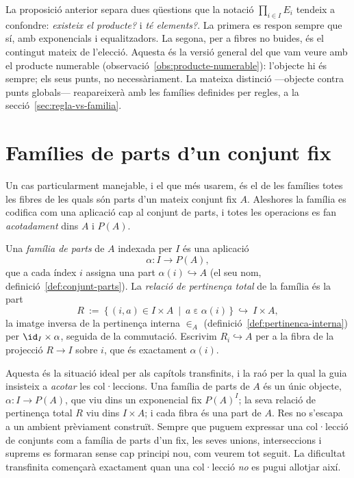 \begin{observacio}\label{obs:objecte-vs-elements}
La proposició anterior separa dues qüestions que la notació
\(\prod_{i\in I}E_i\) tendeix a confondre: \emph{existeix el producte?} i
\emph{té elements?}. La primera es respon sempre que sí, amb exponencials i
equalitzadors. La segona, per a fibres no buides, és el contingut mateix de
l'elecció. Aquesta és la versió general del que vam veure amb el producte
numerable (observació~\ref{obs:producte-numerable}): l'objecte hi és sempre;
els seus punts, no necessàriament. La mateixa distinció ---objecte contra
punts globals--- reapareixerà amb les famílies definides per regles, a la
secció~\ref{sec:regla-vs-familia}.
\end{observacio}

\section{Famílies de parts d'un conjunt fix}\label{sec:families-parts}

Un cas particularment manejable, i el que més usarem, és el de les famílies
totes les fibres de les quals són parts d'un mateix conjunt fix \(A\).
Aleshores la família es codifica com una aplicació cap al conjunt de parts, i
totes les operacions es fan \emph{acotadament} dins \(A\) i \(P(A)\).

\begin{definicio}\label{def:familia-parts}
Una \emph{família de parts} de \(A\) indexada per \(I\) és una aplicació
\[
\alpha\colon I\longrightarrow P(A),
\]
que a cada índex \(i\) assigna una part \(\alpha(i)\hookrightarrow A\)
(el seu nom, definició~\ref{def:conjunt-parts}). La \emph{relació de
pertinença total} de la família és la part
\[
R\ :=\ \{\,(i,a)\in I\times A\ \mid\ a\mathrel{\varepsilon}\alpha(i)\,\}
\ \hookrightarrow\ I\times A,
\]
la imatge inversa de la pertinença interna \({\in_A}\)
(definició~\ref{def:pertinenca-interna}) per \(\id_I\times\alpha\), seguida
de la commutació. Escrivim \(R_i\hookrightarrow A\) per a la fibra de la
projecció \(R\to I\) sobre \(i\), que és exactament \(\alpha(i)\).
\end{definicio}

\begin{observacio}\label{obs:familia-parts-acotada}
Aquesta és la situació ideal per als capítols transfinits, i la raó per la
qual la guia insisteix a \emph{acotar} les col·leccions. Una família de parts
de \(A\) és un únic objecte, \(\alpha\colon I\to P(A)\), que viu dins un
exponencial fix \(P(A)^{I}\); la seva relació de pertinença total \(R\) viu
dins \(I\times A\); i cada fibra és una part de \(A\). Res no s'escapa a un
ambient prèviament construït. Sempre que puguem expressar una col·lecció de
conjunts com a família de parts d'un fix, les seves unions, interseccions i
suprems es formaran sense cap principi nou, com veurem tot seguit. La
dificultat transfinita començarà exactament quan una col·lecció \emph{no} es
pugui allotjar així.
\end{observacio}

